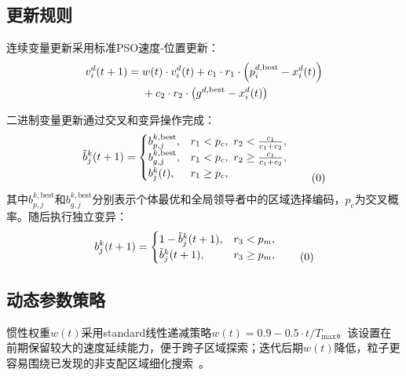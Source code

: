 \subsection{更新规则}

连续变量更新采用标准PSO速度-位置更新：
\vspace{-0.5\baselineskip}
\begin{align}
v_i^d(t+1) ={}& w(t) \cdot v_i^d(t)
 + c_1 \cdot r_1 \cdot \left(p_i^{d,\text{best}} - x_i^d(t)\right) \notag\\
& + c_2 \cdot r_2 \cdot \left(g^{d,\text{best}} - x_i^d(t)\right)
\label{eq:continuous_update}
\end{align}
\vspace{-1.7\baselineskip}

二进制变量更新通过交叉和变异操作完成：
\vspace{-0.5\baselineskip}
\label{eq:binary_crossover}
\begin{equation*}
\tilde{b}_j^k(t+1) =
\begin{cases}
b_{p,j}^{k,\text{best}}, & r_1 < p_c,\ r_2 < \frac{c_1}{c_1+c_2}, \\
b_{g,j}^{k,\text{best}}, & r_1 < p_c,\ r_2 \geq \frac{c_1}{c_1+c_2}, \\
b_j^k(t), & r_1 \geq p_c,
\end{cases}
\tag*{\raisebox{-1.6\baselineskip}{(\theequation)}}
\end{equation*}
\vspace{-0.25\baselineskip}
\noindent{}其中$b_{p,j}^{k,\text{best}}$和$b_{g,j}^{k,\text{best}}$分别表示个体最优和全局领导者中的区域选择编码，$p_c$为交叉概率。随后执行独立变异：
\label{eq:binary_mutation}
\begin{equation*}
b_j^k(t+1) =
\begin{cases}
1-\tilde{b}_j^k(t+1), & r_3 < p_m, \\
\tilde{b}_j^k(t+1), & r_3 \geq p_m,
\end{cases}
\tag*{\raisebox{-0.8\baselineskip}{(\theequation)}}
\end{equation*}
\vspace{-1.0\baselineskip}

\subsection{动态参数策略}

惯性权重$w(t)$采用standard线性递减策略$w(t)=0.9-0.5\cdot t/T_{\max}$。该设置在前期保留较大的速度延续能力，便于跨子区域探索；迭代后期$w(t)$降低，粒子更容易围绕已发现的非支配区域细化搜索~\cite{Shi1998}。

